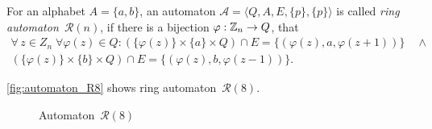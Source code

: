 \section{}

\begin{defn}
    For an alphabet $A = {\{a,b\}}$, an automaton $\mathcal{A} = \langle Q, A, E, \{p\}, \{p\} \rangle$ is called \emph{ring automaton~${\mathcal{R}(n)}$}, if there is a bijection $\varphi: \mathbb{Z}_n \to Q$, that
    \begin{multline*}
        \forall \, z \in Z_n \; \forall \varphi(z) \in Q: (\{\varphi(z)\} \times \{a\} \times Q) \cap E = \{(\varphi(z),a,\varphi(z+1))\} \quad \land \\
            (\{\varphi(z)\} \times \{b\} \times Q) \cap E = \{(\varphi(z),b,\varphi(z-1))\}.
    \end{multline*}
\end{defn}

\begin{example}
    \autoref*{fig:automaton_R8} shows ring automaton~${\mathcal{R}(8)}$.
\end{example}

\begin{figure}[h]
    \centering
    
    \caption{Automaton~${\mathcal{R}(8)}$}\label{fig:automaton_R8}
\end{figure}